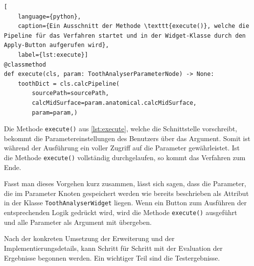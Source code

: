 \begin{lstlisting}[
    language={python},
    caption={Ein Ausschnitt der Methode \texttt{execute()}, welche die Pipeline für das Verfahren startet und in der Widget-Klasse durch den Apply-Button aufgerufen wird},
    label={lst:execute}]
@classmethod
def execute(cls, param: ToothAnalyserParameterNode) -> None:
    toothDict = cls.calcPipeline(
	    sourcePath=sourcePath,
	    calcMidSurface=param.anatomical.calcMidSurface,
	    param=param,)
\end{lstlisting}

Die Methode \texttt{execute()} aus \ref{lst:execute}, welche die Schnittstelle vorschreibt,
bekommt die Parametereinstellungen des Benutzers über das Argument. Somit ist während
der Ausführung ein voller Zugriff auf die Parameter gewährleistet. Ist die
Methode \texttt{execute()} vollständig durchgelaufen, so kommt das Verfahren zum
Ende.

Fasst man dieses Vorgehen kurz zusammen, lässt sich sagen, dass die Parameter, die
im Parameter Knoten gespeichert werden wie bereits beschrieben als Attribut in der
Klasse \texttt{ToothAnalyserWidget} liegen. Wenn ein Button zum Ausführen der entsprechenden
Logik gedrückt wird, wird die Methode \texttt{execute()} ausgeführt und alle Parameter
als Argument mit übergeben.

Nach der konkreten Umsetzung der Erweiterung und der Implementierungsdetails,
kann Schritt für Schritt mit der Evaluation der Ergebnisse begonnen werden. Ein wichtiger
Teil sind die Testergebnisse.
